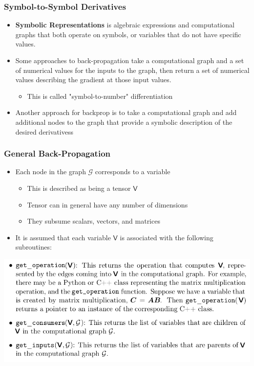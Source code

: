 \documentclass[11pt]{article}
\begin{document}
\subsubsection{Symbol-to-Symbol Derivatives}
\label{sec:org8eec260}
\begin{itemize}
\item \textbf{Symbolic Representations} is algebraic expressions and computational graphs that both operate on symbols, or variables that do not have speciﬁc values.

\item Some approaches to back-propagation take a computational graph and a set of numerical values for the inputs to the graph, then return a set of numerical values describing the gradient at those input values.
\begin{itemize}
\item This is called "symbol-to-number" diﬀerentiation
\end{itemize}

\item Another approach for backprop is to take a computational graph and add additional nodes to the graph that provide a symbolic description of the desired derivativess
\end{itemize}

\subsubsection{General Back-Propagation}
\label{sec:org5870e67}
\begin{itemize}
\item Each node in the graph \(\mathcal G\) corresponds to a variable
\begin{itemize}
\item This is described as being a tensor \(\mathbf{\mathsf V}\)
\item Tensor can in general have any number of dimensions
\item They subsume scalars, vectors, and matrices
\end{itemize}

\item It is assumed that each variable \(\mathbf{\mathsf V}\) is associated with the following subroutines:
\end{itemize}
\begin{center}
\includegraphics[width=.9\linewidth]{Deep Feedforward Networks/screenshot_2018-10-02_08-51-44.png}
\end{center} 
\end{document}
